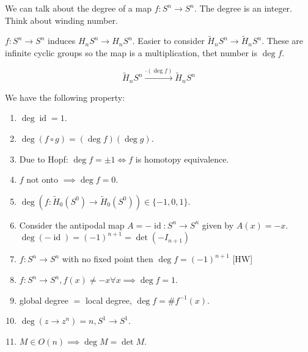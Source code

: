 \documentclass{article}
\theoremstyle{definition}
\begin{document}
    We can talk about the degree of a map \(f: S^n \to S^n\). The degree is an integer. Think about winding number.

    \(f: S^n \to S^n\) induces \(H_n S^n \to H_n S^n\). Easier to consider \(\widetilde{H}_n S^n \to \widetilde{H}_n S^n\). These are infinite cyclic groups so the map is a multiplication, thet number is \(\deg f\).

    \[
        \widetilde{H}_n S^n \xrightarrow{\cdot (\deg f)} \widetilde{H}_n S^n
    \]

    We have the following property:

    \begin{enumerate}[label=\arabic*)]
        \item \(\deg \operatorname{id} = 1 \).
        \item \(\deg (f \circ g) = (\deg f)(\deg g)\).
        \item Due to Hopf: \(\deg f = \pm 1 \iff f\) is homotopy equivalence.
        \item \(f\) not onto \(\implies \deg f = 0\).
        \item \(\deg(f: \widetilde{H}_0 (S^0) \to \widetilde{H}_0(S^0)) \in \{ -1,0,1 \}\).
        \item Consider the antipodal map \(A = - \operatorname{id}: S^n \to S^n \) given by \(A(x) = -x\). \(\deg(-\operatorname{id}) = (-1)^{n+1} = \det(-I_{n+1})\)
        \item \(f: S^n \to S^n\) with no fixed point then \(\deg f = (-1)^{n+1}\) [HW]
        \item \(f: S^n \to S^n, f(x) \neq - x \forall x \implies \deg f = 1\).
        \item global degree \(=\) local degree, \(\deg f = \# f ^{-1} (x)\).
        \item \(\deg(z \to z^n) = n, S^1 \to S^1\).
        \item \(M\in O(n) \implies \deg M = \det M\).  
    \end{enumerate} 
\end{document}
